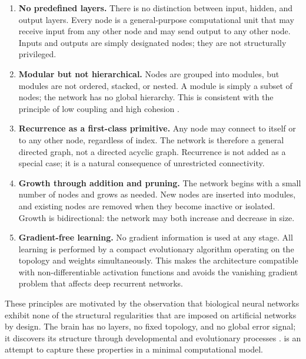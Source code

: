 \begin{enumerate}
  \item \textbf{No predefined layers.} There is no distinction between
    input, hidden, and output layers. Every node is a general-purpose
    computational unit that may receive input from any other node and
    may send output to any other node. Inputs and outputs are simply
    designated nodes; they are not structurally privileged.

  \item \textbf{Modular but not hierarchical.} Nodes are grouped into
    modules, but modules are not ordered, stacked, or nested. A module
    is simply a subset of nodes; the network has no global hierarchy.
    This is consistent with the principle of low coupling and high
    cohesion \citep{parnas1972modularity}.

  \item \textbf{Recurrence as a first-class primitive.} Any node may
    connect to itself or to any other node, regardless of index. The
    network is therefore a general directed graph, not a directed
    acyclic graph. Recurrence is not added as a special case; it is a
    natural consequence of unrestricted connectivity.

  \item \textbf{Growth through addition and pruning.} The network
    begins with a small number of nodes and grows as needed. New nodes
    are inserted into modules, and existing nodes are removed when they
    become inactive or isolated. Growth is bidirectional: the network
    may both increase and decrease in size.

  \item \textbf{Gradient-free learning.} No gradient information is
    used at any stage. All learning is performed by a compact
    evolutionary algorithm operating on the topology and weights
    simultaneously. This makes the architecture compatible with
    non-differentiable activation functions and avoids the vanishing
    gradient problem that affects deep recurrent networks.
\end{enumerate}

These principles are motivated by the observation that biological
neural networks exhibit none of the structural regularities that are
imposed on artificial networks by design. The brain has no layers, no
fixed topology, and no global error signal; it discovers its structure
through developmental and evolutionary processes
\citep{gershenson2010guiding, plantec2024evolving}. \modnet{} is an
attempt to capture these properties in a minimal computational model.

